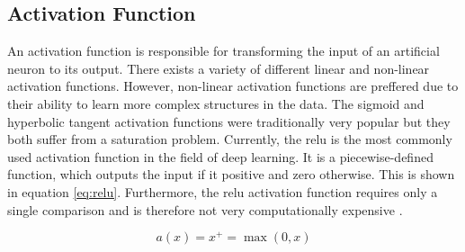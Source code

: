 

\subsection{Activation Function}
\label{subsec:theoretical_background:ann:activation_function}

An activation function is responsible for transforming the input of an artificial neuron to its output.
There exists a variety of different linear and non-linear activation functions.
However, non-linear activation functions are preffered due to their ability to learn more complex structures in the data.
The sigmoid and hyperbolic tangent activation functions were traditionally very popular but they both suffer from a saturation problem.
Currently, the \acrfull{relu} is the most commonly used activation function in the field of deep learning.
It is a piecewise-defined function, which outputs the input if it positive and zero otherwise.
This is shown in equation \ref{eq:relu}.
Furthermore, the \acrshort{relu} activation function requires only a single comparison and is therefore not very computationally expensive \cite{}. %

\begin{equation}
  a(x) = x^+ = \max(0, x)
  \label{eq:relu}
\end{equation}

